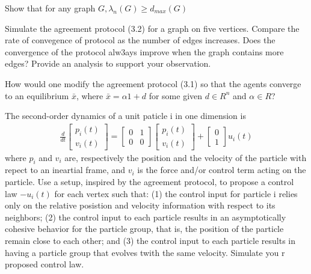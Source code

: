 \documentclass{article}
\begin{document}
\begin{problem}
    Show that for any graph $G, \lambda_n(G) \geq d_{max}(G)$
    
\end{problem}

\begin{problem}
    Simulate the agreement protocol (3.2) for a graph on five vertices. Compare the rate of convegence of protocol as the number of edges increases. Does the convergence of the protocol alw3ays improve when the graph contains more edges? Provide an analysis to support your observation. 

\end{problem}

\begin{problem}
    How would one modify the agreement protocol (3.1) so that the agents converge to an equilibrium $\bar{x}$, where $\bar{x} = \alpha 1 + d$ for some given $d \in R^n$ and $\alpha \in R$?

\end{problem}
\begin{problem}
    The second-order dynamics of a unit paticle i in one dimension is 
    \begin{align*}
        \frac{d}{dt} 
        \begin{bmatrix*}
            p_i(t)\\
            v_i(t)  
        \end{bmatrix*}
        = \begin{bmatrix*}
            0 & 1\\
            0 & 0 
        \end{bmatrix*}
        \begin{bmatrix*}
            p_i(t)\\
            v_i(t)  
        \end{bmatrix*}
        + 
        \begin{bmatrix*}
            0\\
            1
        \end{bmatrix*} u_i(t)
    \end{align*}
    where $p_i$ and $v_i$ are, respectively the position and the velocity of the particle with repect to an ineartial frame, and $v_i$ is the force and/or control term acting on the particle. Use a setup, inspired by the agreement protocol, to propose a control law $-u_i(t)$ for each vertex such that: (1) the control input for particle i relies only on the relative posistion and velocity information with respect to its neighbors; (2) the control input to each particle results in an asymptotically cohesive behavior for the particle group, that is, the position of the particle remain close to each other; and (3) the control input to each particle results in having a particle group that evolves twith the same velocity. Simulate you r proposed control law.

\end{problem}
\end{document}
